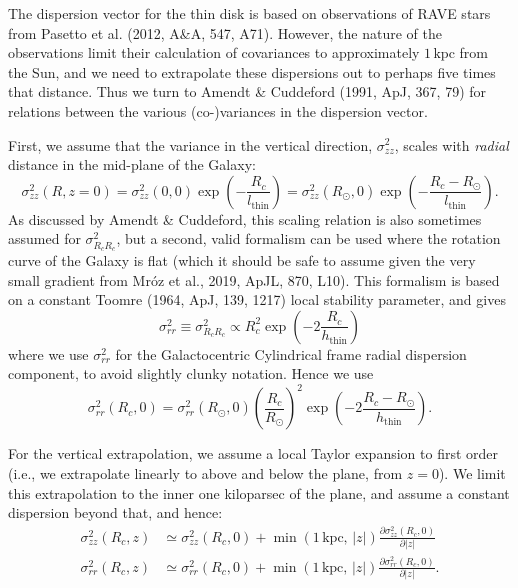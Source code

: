 \documentclass[fleqn,usenatbib]{mnras}
\begin{document}
The dispersion vector for the thin disk is based on observations of RAVE stars from Pasetto et al. (2012, A\&A, 547, A71). However, the nature of the observations limit their calculation of covariances to approximately $1\,\mathrm{kpc}$ from the Sun, and we need to extrapolate these dispersions out to perhaps five times that distance. Thus we turn to Amendt \& Cuddeford (1991, ApJ, 367, 79) for relations between the various (co-)variances in the dispersion vector.

First, we assume that the variance in the vertical direction, $\sigma_{zz}^2$, scales with \textit{radial} distance in the mid-plane of the Galaxy:
\begin{equation}
    \sigma_{zz}^2(R, z=0) = \sigma_{zz}^2(0, 0) \exp\left(-\frac{R_c}{l_\mathrm{thin}}\right) = \sigma_{zz}^2(R_\odot, 0) \exp\left(-\frac{R_c - R_\odot}{l_\mathrm{thin}}\right).
\end{equation}
As discussed by Amendt \& Cuddeford, this scaling relation is also sometimes assumed for $\sigma_{R_cR_c}^2$, but a second, valid formalism can be used where the rotation curve of the Galaxy is flat (which it should be safe to assume given the very small gradient from Mr\'{o}z et al., 2019, ApJL, 870, L10). This formalism is based on a constant Toomre (1964, ApJ, 139, 1217) local stability parameter, and gives
\begin{equation}
    \sigma_{rr}^2 \equiv \sigma_{R_cR_c}^2 \propto R_c^2 \exp\left(-2\frac{R_c}{h_\mathrm{thin}}\right)
\end{equation}
where we use $\sigma_{rr}^2$ for the Galactocentric Cylindrical frame radial dispersion component, to avoid slightly clunky notation. Hence we use
\begin{equation}
    \sigma_{rr}^2(R_c, 0) = \sigma_{rr}^2(R_\odot, 0) \left(\frac{R_c}{R_\odot}\right)^2 \exp\left(-2\frac{R_c - R_\odot}{h_\mathrm{thin}}\right).
\end{equation}

For the vertical extrapolation, we assume a local Taylor expansion to first order (i.e., we extrapolate linearly to above and below the plane, from $z = 0$). We limit this extrapolation to the inner one kiloparsec of the plane, and assume a constant dispersion beyond that, and hence:
\begin{align}
    \sigma_{zz}^2(R_c, z) &\simeq \sigma_{zz}^2(R_c, 0) + \min\left(1\,\mathrm{kpc},\,\lvert z \lvert\right) \frac{\partial \sigma_{zz}^2(R_c, 0)}{\partial \lvert z \lvert} \\
    \sigma_{rr}^2(R_c, z) &\simeq \sigma_{rr}^2(R_c, 0) + \min\left(1\,\mathrm{kpc},\,\lvert z \lvert\right) \frac{\partial \sigma_{rr}^2(R_c, 0)}{\partial \lvert z \lvert}.
\end{align}
\end{document}
